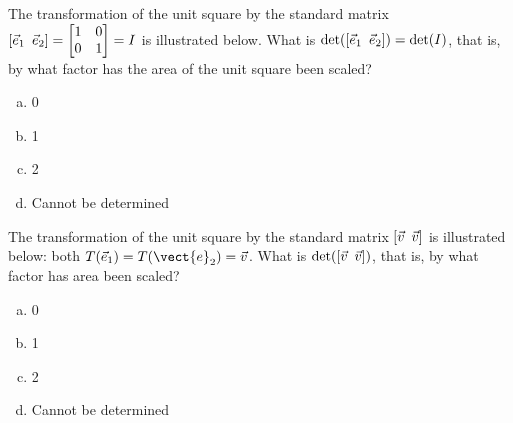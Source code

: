 \begin{applicationActivities}{1}{25}
\begin{activity}{2}
The transformation of the unit square by the
standard matrix \([\vec{e}_1\hspace{0.5em} \vec{e}_2]=\begin{bmatrix}1&0\\0&1\end{bmatrix}=I\) is illustrated below.
What is $\det([\vec{e}_1\hspace{0.5em} \vec{e}_2])=\det(I)$, that is, by what
factor has the area of the unit square been scaled?
\begin{center}
\end{center}
  \begin{enumerate}[a)]
    \item 0
    \item 1
    \item 2
    \item Cannot be determined
  \end{enumerate}
\end{activity}

\begin{activity}{2}
The transformation of the unit square by the
standard matrix \([\vec{v}\hspace{0.5em} \vec{v}]\) is illustrated below: both
\(T(\vec{e}_1)=T(\vect{e}_2)=\vec{v}\).
What is \(\det([\vec{v}\hspace{0.5em} \vec{v}])\), that is, by what factor has
area been scaled?
\begin{center}
\end{center}
  \begin{enumerate}[a)]
    \item 0
    \item 1
    \item 2
    \item Cannot be determined
  \end{enumerate}
\end{activity}



\end{applicationActivities}
